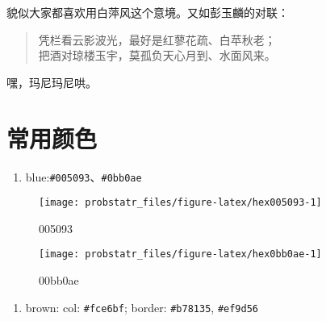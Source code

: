 \documentclass[]{ctexbook}
\newenvironment{Shaded}{\begin{snugshade}}{\end{snugshade}}
\newcommand{\ControlFlowTok}[1]{\textcolor[rgb]{0.13,0.29,0.53}{\textbf{#1}}}
\newcommand{\DataTypeTok}[1]{\textcolor[rgb]{0.13,0.29,0.53}{#1}}
\newcommand{\KeywordTok}[1]{\textcolor[rgb]{0.13,0.29,0.53}{\textbf{#1}}}
\newcommand{\NormalTok}[1]{#1}
\newcommand{\OperatorTok}[1]{\textcolor[rgb]{0.81,0.36,0.00}{\textbf{#1}}}
\newcommand{\StringTok}[1]{\textcolor[rgb]{0.31,0.60,0.02}{#1}}
\providecommand{\tightlist}{%
  \setlength{\itemsep}{0pt}\setlength{\parskip}{0pt}}
\begin{document}
貌似大家都喜欢用白萍风这个意境。又如彭玉麟的对联：

\begin{quote}
凭栏看云影波光，最好是红蓼花疏、白苹秋老；\\
把酒对琼楼玉宇，莫孤负天心月到、水面风来。
\end{quote}

嘿，玛尼玛尼哄。

\hypertarget{colors}{%
\chapter{常用颜色}\label{colors}}

\begin{enumerate}
\def\labelenumi{\arabic{enumi}.}
\setcounter{enumi}{1}
\tightlist
\item
  blue:\texttt{\#005093}、\texttt{\#0bb0ae}
\end{enumerate}

\begin{Shaded}
\end{Shaded}

\begin{figure}

{\centering \texttt{[image: probstatr\_files/figure-latex/hex005093-1]} 

}

\caption{005093}\label{fig:hex005093}
\end{figure}

\begin{figure}

{\centering \texttt{[image: probstatr\_files/figure-latex/hex0bb0ae-1]} 

}

\caption{00bb0ae}\label{fig:hex0bb0ae}
\end{figure}

\begin{enumerate}
\def\labelenumi{\arabic{enumi}.}
\setcounter{enumi}{2}
\tightlist
\item
  brown: col: \texttt{\#fce6bf}; border: \texttt{\#b78135},
  \texttt{\#ef9d56}
\end{enumerate}
\end{document}
